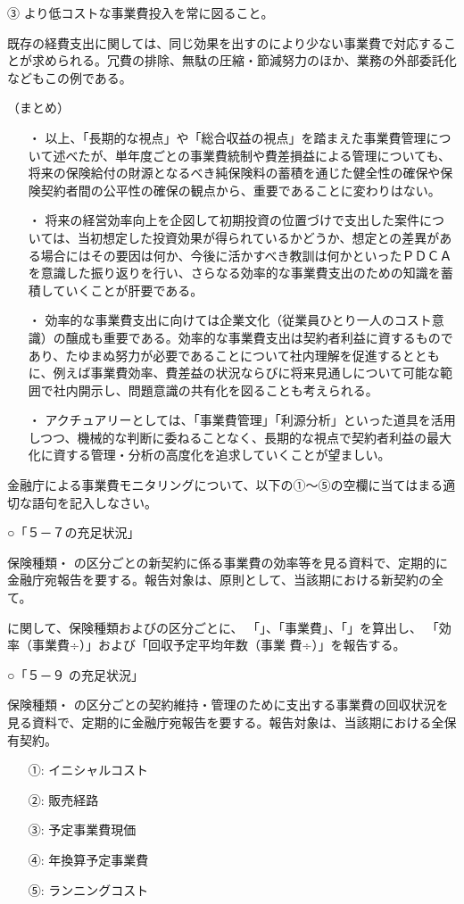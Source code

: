 \documentclass[report,gutter=10mm,fore-edge=10mm,uplatex,dvipdfmx]{jlreq}
\begin{document}
③ より低コストな事業費投入を常に図ること。

既存の経費支出に関しては、同じ効果を出すのにより少ない事業費で対応することが求められる。冗費の排除、無駄の圧縮・節減努力のほか、業務の外部委託化などもこの例である。

（まとめ）

\begin{itemize}
 \item [・]  以上、「長期的な視点」や「総合収益の視点」を踏まえた事業費管理について述べたが、単年度ごとの事業費統制や費差損益による管理についても、将来の保険給付の財源となるべき純保険料の蓄積を通じた健全性の確保や保険契約者間の公平性の確保の観点から、重要であることに変わりはない。
 \item [・]  将来の経営効率向上を企図して初期投資の位置づけで支出した案件については、当初想定した投資効果が得られているかどうか、想定との差異がある場合にはその要因は何か、今後に活かすべき教訓は何かといったＰＤＣＡを意識した振り返りを行い、さらなる効率的な事業費支出のための知識を蓄積していくことが肝要である。
 \item [・]  効率的な事業費支出に向けては企業文化（従業員ひとり一人のコスト意識）の醸成も重要である。効率的な事業費支出は契約者利益に資するものであり、たゆまぬ努力が必要であることについて社内理解を促進するとともに、例えば事業費効率、費差益の状況ならびに将来見通しについて可能な範囲で社内開示し、問題意識の共有化を図ることも考えられる。
 \item [・]  アクチュアリーとしては、「事業費管理」「利源分析」といった道具を活用しつつ、機械的な判断に委ねることなく、長期的な視点で契約者利益の最大化に資する管理・分析の高度化を追求していくことが望ましい。
\end{itemize}


金融庁による事業費モニタリングについて、以下の①～⑤の空欄に当てはまる適切な語句を記入しなさい。

\noindent ○「５－７の充足状況」

保険種類・
の区分ごとの新契約に係る事業費の効率等を見る資料で、定期的に
金融庁宛報告を要する。報告対象は、原則として、当該期における新契約の全て。

に関して、保険種類およびの区分ごとに、
「」、「事業費」、「」を算出し、
「効率（事業費÷）」および「回収予定平均年数（事業
費÷）」を報告する。

\noindent ○「５－９ の充足状況」

保険種類・
の区分ごとの契約維持・管理のために支出する事業費の回収状況を
見る資料で、定期的に金融庁宛報告を要する。報告対象は、当該期における全保有契約。
\answer{}
\begin{itemize}
\item[ ①: ] イニシャルコスト
\item[ ②: ] 販売経路
\item[ ③: ] 予定事業費現価
\item[ ④: ] 年換算予定事業費
\item[ ⑤: ] ランニングコスト
\end{itemize}
\end{document}
